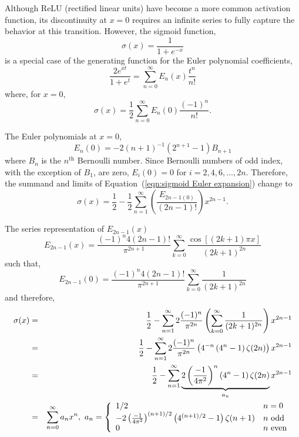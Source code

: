 Although ReLU (rectified linear units) have become a more common activation function, its discontinuity at $x = 0$ requires an infinite series to fully capture the behavior at this transition. However, the sigmoid function,
\begin{equation}
	\sigma(x) = \frac{1}{1 + e^{-x}}
	\label{eqn:sigmoid}
\end{equation}
is a special case of the generating function for the Euler polynomial coefficients,
\begin{equation}
	\frac{2e^{x t}}{1 + e^t} = \sum_{n=0}^\infty E_n(x) \frac{t^n}{n!}
\end{equation}
where, for $x = 0$,
\begin{equation}
	\sigma(x) = \frac{1}{2} \sum_{n=0}^\infty E_n(0) \frac{(-1)^n}{n!}.
	\label{eqn:sigmoid Euler expansion}
\end{equation}

The Euler polynomials at $x=0$,
\begin{equation}
	E_n(0) = -2(n+1)^{-1} \left( 2^{n+1} - 1 \right) B_{n+1}
\end{equation}
where $B_n$ is the $n^\textrm{th}$ Bernoulli number. Since Bernoulli numbers of odd index, with the exception of $B_1$, are zero, $E_i(0) = 0$ for $i = 2, 4, 6, \ldots, 2n$. Therefore, the summand and limits of Equation~(\ref{eqn:sigmoid Euler expansion}) change to
\begin{equation}
	\sigma(x) = \frac{1}{2} - \frac{1}{2} \sum_{n=1}^\infty \left( \frac{E_{2n-1(0)}}{(2n-1)!} \right) x^{2n-1}.
\end{equation}

The series representation of $E_{2n-1}(x)$
\begin{equation}
	E_{2n-1}(x) = \frac{(-1)^n 4 (2n - 1)!}{\pi^{2n+1}} \sum_{k=0}^\infty \frac{\cos [(2k + 1) \pi x]}{(2k + 1)^{2n}}
\end{equation}
such that,
\begin{equation}
	E_{2n-1}(0) = \frac{(-1)^n 4 (2n - 1)!}{\pi^{2n+1}} \sum_{k=0}^\infty \frac{1}{(2k + 1)^{2n}}
\end{equation}
and therefore,
\begin{eqnarray}
	\sigma(x) & = & \frac{1}{2} - \sum_{n=1}^\infty 2 \frac{(-1)^n}{\pi^{2n}} \left( \sum_{k=0}^\infty \frac{1}{(2k+1)^{2n}} \right) x^{2n-1} \\
		& = & \frac{1}{2} - \sum_{n=1}^\infty 2 \frac{(-1)^n}{\pi^{2n}} \left( 4^{-n} \left( 4^n - 1 \right) \zeta(2n) \right) x^{2n-1} \nonumber \\
		& = & \frac{1}{2} - \sum_{n=1}^\infty \underbrace{2 \left( \frac{-1}{4\pi^2} \right)^n \left( 4^n - 1 \right) \zeta(2n)}_{a_n} x^{2n-1} \nonumber \\
		& = & \sum_{n=0}^\infty a_n x^n,\ a_n = \left\{ \begin{array}{l l}
			1/2	& n = 0 \\
			-2 \left( \frac{-1}{4\pi^2} \right)^{(n+1)/2} \left( 4^{(n+1)/2} - 1 \right)\zeta(n+1)	& n\ \text{odd} \\
			0	& n\ \text{even}
		\end{array}\right.
		\label{eqn:sigmoid zeta expansion}
\end{eqnarray}